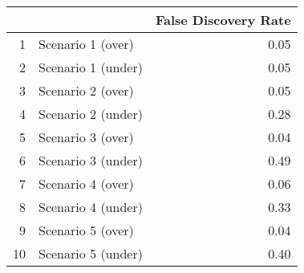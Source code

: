 \begin{tabular}{rlr}
  \hline
 &  & False Discovery Rate \\ 
  \hline
1 & Scenario 1 (over) & 0.05 \\ 
  2 & Scenario 1 (under) & 0.05 \\ 
  3 & Scenario 2 (over) & 0.05 \\ 
  4 & Scenario 2 (under) & 0.28 \\ 
  5 & Scenario 3 (over) & 0.04 \\ 
  6 & Scenario 3 (under) & 0.49 \\ 
  7 & Scenario 4 (over) & 0.06 \\ 
  8 & Scenario 4 (under) & 0.33 \\ 
  9 & Scenario 5 (over) & 0.04 \\ 
  10 & Scenario 5 (under) & 0.40 \\ 
   \hline
\end{tabular}
